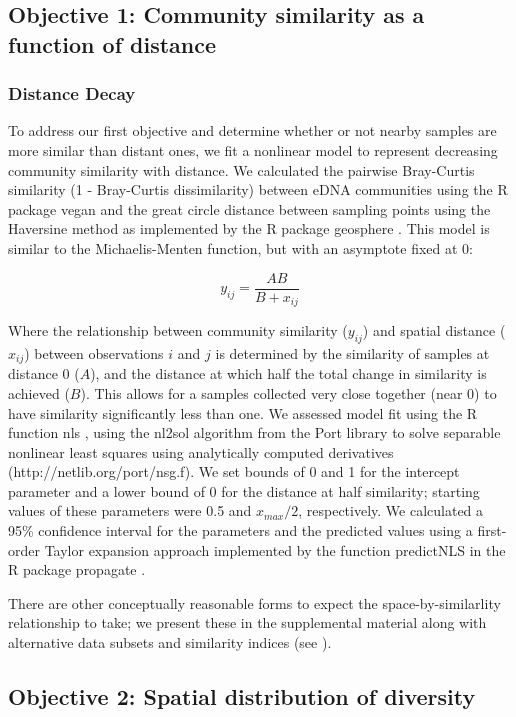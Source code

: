 \documentclass[11pt,letterpaper]{article} %
\begin{document}
\subsection*{Objective 1: Community similarity as a function of distance}
\subsubsection*{Distance Decay}
To address our first objective and determine whether or not nearby samples are more similar than distant ones, we fit a nonlinear model to represent decreasing community similarity with distance. We calculated the pairwise Bray-Curtis similarity (1 - Bray-Curtis dissimilarity) between eDNA communities using the R package vegan \citep{vegan} and the great circle distance between sampling points using the Haversine method as implemented by the R package geosphere \citep{geosphere}. This model is similar to the Michaelis-Menten function, but with an asymptote fixed at 0:

\begin{equation}\label{MM_asy0}
	y_{ij} = \frac{AB}{B + x_{ij}}
\end{equation}


Where the relationship between community similarity ($y_{ij}$) and spatial distance ($x_{ij}$) between observations $i$ and $j$ is determined by the similarity of samples at distance 0 ($A$), and the distance at which half the total change in similarity is achieved ($B$). This allows for a samples collected very close together (near 0) to have similarity significantly less than one. We assessed model fit using the R function nls \citep{R}, using the nl2sol algorithm from the Port library to solve separable nonlinear least squares using analytically computed derivatives (http://netlib.org/port/nsg.f). We set bounds of 0 and 1 for the intercept parameter and a lower bound of 0 for the distance at half similarity; starting values of these parameters were 0.5 and $x_{max}/2$, respectively. We calculated a 95\% confidence interval for the parameters and the predicted values using a first-order Taylor expansion approach implemented by the function predictNLS in the R package propagate \citep{propagate}.


There are other conceptually reasonable forms to expect the space-by-similarlity relationship to take; we present these in the supplemental material along with alternative data subsets and similarity indices (see ).

\subsection*{Objective 2: Spatial distribution of diversity}
\end{document}
